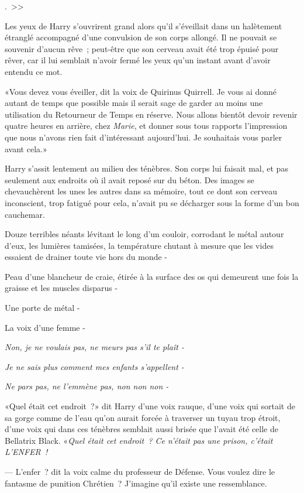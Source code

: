 
.~>>

\hplettrineextrapara
Les yeux de Harry s'ouvrirent grand alors qu'il s'éveillait dans un halètement étranglé accompagné d'une convulsion de son corps allongé. Il ne pouvait se souvenir d'aucun rêve~; peut-être que son cerveau avait été trop épuisé pour rêver, car il lui semblait n'avoir fermé les yeux qu'un instant avant d'avoir entendu ce mot.

«Vous devez vous éveiller, dit la voix de Quirinus Quirrell. Je vous ai donné autant de temps que possible mais il serait sage de garder au moins une utilisation du Retourneur de Temps en réserve. Nous allons bientôt devoir revenir quatre heures en arrière, chez \emph{Marie}, et donner sous tous rapports l'impression que nous n'avons rien fait d'intéressant aujourd'hui. Je souhaitais vous parler avant cela.»

Harry s'assit lentement au milieu des ténèbres. Son corps lui faisait mal, et pas seulement aux endroits où il avait reposé sur du béton. Des images se chevauchèrent les unes les autres dans sa mémoire, tout ce dont son cerveau inconscient, trop fatigué pour cela, n'avait pu se décharger sous la forme d'un bon cauchemar.

Douze terribles néants lévitant le long d'un couloir, corrodant le métal autour d'eux, les lumières tamisées, la température chutant à mesure que les vides essaient de drainer toute vie hors du monde -

Peau d'une blancheur de craie, étirée à la surface des os qui demeurent une fois la graisse et les muscles disparus -

Une porte de métal -

La voix d'une femme -

\emph{Non, je ne voulais pas, ne meurs pas s'il te plaît -}

\emph{Je ne sais plus comment mes enfants s'appellent -}

\emph{Ne pars pas, ne l'emmène pas, non non non -}

«Quel était cet endroit~?» dit Harry d'une voix rauque, d'une voix qui sortait de sa gorge comme de l'eau qu'on aurait forcée à traverser un tuyau trop étroit, d'une voix qui dans ces ténèbres semblait aussi brisée que l'avait été celle de Bellatrix Black. «\emph{Quel était cet endroit~? Ce n'était pas une prison, c'était L'ENFER~!}

--- L'enfer~? dit la voix calme du professeur de Défense. Vous voulez dire le fantasme de punition Chrétien~? J'imagine qu'il existe une ressemblance.

